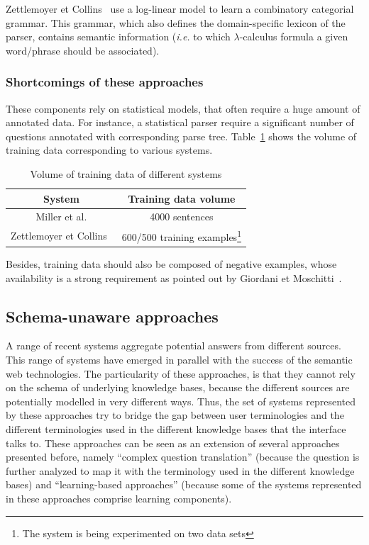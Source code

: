 \documentclass[10pt,journal,letterpaper,compsoc]{IEEEtran}
\begin{document}
Zettlemoyer et Collins~\cite{DBLP:conf/uai/ZettlemoyerC05} use a log-linear
model to learn a combinatory categorial grammar.
This grammar, which also defines the domain-specific lexicon of the parser,
contains semantic information ({\it i.e.} to which $\lambda$-calculus formula a
given word/phrase should be associated).







\subsubsection{Shortcomings of these approaches}
These components rely on statistical models, that often require a huge amount of
annotated data.
For instance, a statistical parser require a significant number of questions
annotated with corresponding parse tree. Table~\ref{tab:training-data} shows the
volume of training data corresponding to various systems.
\begin{table}
\centering
\begin{tabular}{|c|c|}\hline
{\bf System} & {\bf Training data volume}\\\hline\hline
Miller et al. & 4000 sentences\\\hline
Zettlemoyer et Collins~\cite{DBLP:conf/uai/ZettlemoyerC05} & 600/500 training
examples\footnote{The system is being experimented on two data sets}\\\hline
\end{tabular}
\caption{Volume of training data of different systems}
\label{tab:training-data}
\end{table}
Besides, training data should also be composed of negative examples, whose
availability is a strong requirement as pointed out by Giordani et
Moschitti~\cite{Giordani:2009:SSK:1617768.1617815}.


\subsection{Schema-unaware approaches}
A range of recent systems aggregate potential answers from different sources.
This range of systems have emerged in parallel with the success of the semantic
web technologies. 
The particularity of these approaches, is that they cannot rely on the schema of
underlying knowledge bases, because the different sources are potentially
modelled in very different ways. 
Thus, the set of systems represented by these approaches try to bridge the gap
between user terminologies and the different terminologies used in the different
knowledge bases that the interface talks to.
These approaches can be seen as an extension of several approaches presented
before, namely ``complex question translation'' (because the question is
further analyzed to map it with the terminology used in the different knowledge
bases) and ``learning-based approaches'' (because some of the systems
represented in these approaches comprise learning components).
\end{document}
